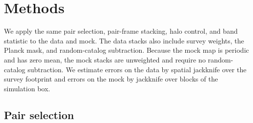 %
%
%
%

\section{Methods}
\label{sec:method}

We apply the same pair selection, pair-frame stacking, halo control, and band
statistic to the data and mock. The data stacks also include survey weights,
the Planck mask, and random-catalog subtraction. Because the mock map is
periodic and has zero mean, the mock stacks are unweighted and require no
random-catalog subtraction. We estimate errors on the data by spatial
jackknife over the survey footprint and errors on the mock by jackknife over
blocks of the simulation box.

\subsection{Pair selection}
\label{sec:pairs}

